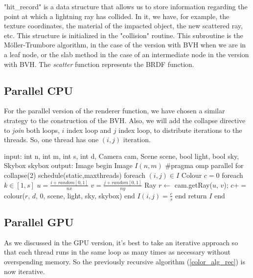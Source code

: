 \documentclass[titlepage,12pt]{report}
\begin{document}
"hit\_record" is a data structure that allows us to store information regarding the point at which a lightning ray has collided. In it, we have, for example, the texture coordinates, the material of the impacted object, the new scattered ray, etc. This structure is initialized in the "collision" routine. This subroutine is the Möller-Trumbore algorithm, in the case of the version with BVH when we are in a leaf node, or the slab method in the case of an intermediate node in the version with BVH. The \textit{scatter} function represents the BRDF function.

\subsection{Parallel CPU}

For the parallel version of the renderer function, we have chosen a similar strategy to the construction of the BVH. Also, we will add the collapse directive to \textit{join} both loops, $i$ index loop and $j$ index loop, to distribute iterations to the threads. So, one thread has one $(i,j)$ iteration.

\begin{algorithm}[caption={renderer sequential}, label={renderer_cpu_par_alg}]
input: int n, int m, int s, int d, Camera cam, Scene scene, bool light, bool sky, Skybox skybox
output: Image
begin
  Image $I(n,m)$
  #pragma omp parallel for collapse(2) schedule(static,maxthreads)
  foreach $(i,j) \in I$
    Colour $c = 0$
    foreach $k \in [1,s]$
      $u = \frac{i + random[0,1]}{nx}$
      $v = \frac{j + random[0,1]}{ny}$
      Ray $r \gets $ cam.getRay($u$, $v$);      
      $c += $ colour($r$, $d$, $0$, scene, light, sky, skybox)
    end
    $I(i,j) = \frac{c}{s}$
  end
  return $I$
end
\end{algorithm}


\subsection{Parallel GPU}

As we discussed in the GPU version, it's best to take an iterative approach so that each thread runs in the same loop as many times as necessary without overspending memory. So the previously recursive algorithm (\ref{color_alg_rec}) is now iterative.
\end{document}
